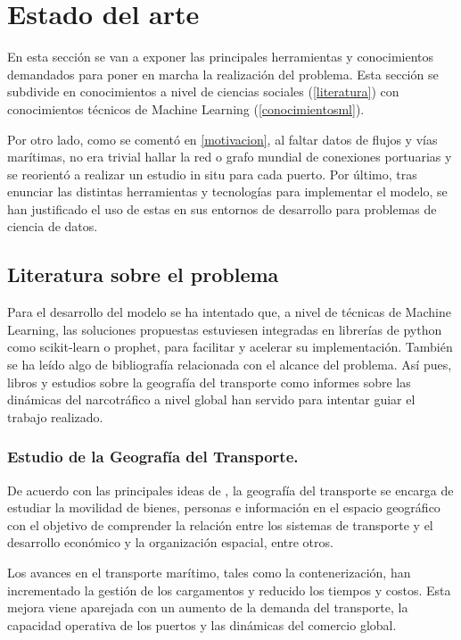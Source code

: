 \documentclass[12pt]{article}
\begin{document}
\newpage

\section{Estado del arte}
En esta sección se van a exponer las principales herramientas y conocimientos demandados para poner en marcha la realización del problema. Esta sección se subdivide en conocimientos a nivel de ciencias sociales (\ref{literatura}) con conocimientos técnicos de Machine Learning (\ref{conocimientosml}).

Por otro lado, como se comentó en \ref{motivacion}, al faltar datos de flujos y vías marítimas, no era trivial hallar la red o grafo mundial de conexiones portuarias y se reorientó a realizar un estudio in situ para cada puerto. Por último, tras enunciar las distintas herramientas y tecnologías para implementar el modelo, se han justificado el uso de estas en sus entornos de desarrollo para problemas de ciencia de datos.

	\subsection{\label{literatura}Literatura sobre el problema}
	Para el desarrollo del modelo se ha intentado que, a nivel de técnicas de Machine Learning, las soluciones propuestas estuviesen integradas en librerías de python como scikit-learn o prophet, para facilitar y acelerar su implementación. También se ha leído algo de bibliografía relacionada con el alcance del problema. Así pues, libros y estudios sobre la geografía del transporte como informes sobre las dinámicas del narcotráfico a nivel global han servido para intentar guiar el trabajo realizado. 
	
		\subsubsection{Estudio de la Geografía del Transporte.}
		De acuerdo con las principales ideas de \cite{rodrigue2024geography}, la geografía del transporte se encarga de estudiar la movilidad de bienes, personas e información en el espacio geográfico con el objetivo de comprender la relación entre los sistemas de transporte y el desarrollo económico y la organización espacial, entre otros.
		
		Los avances en el transporte marítimo, tales como la contenerización, han incrementado la gestión de los cargamentos y reducido los tiempos y costos. Esta mejora viene aparejada con un aumento de la demanda del transporte, la capacidad operativa de los puertos y las dinámicas del comercio global.
		
\end{document}
